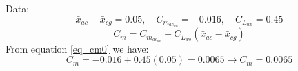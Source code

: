 Data:
$$\bar x_{ac} - \bar x_{cg} = 0.05, \quad C_{m_{ac_{wb}}} = -0.016, \quad C_{L_{wb}} = 0.45$$
\begin{equation}
C_m = C_{m_{ac_{wb}}}  + C_{L_{wb}} (\bar x_{ac} - \bar x_{cg} )
\label{eq_cm0}
\end{equation}
From equation \ref{eq_cm0} we have:
$$C_m = -0.016 + 0.45(0.05) = 0.0065 \to C_m = 0.0065$$